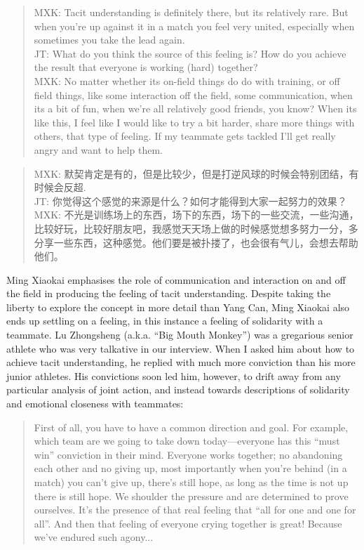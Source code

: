 \begin{CJK}{UTF8}{gbsn}
    \begin{quotation}
        MXK: Tacit understanding is definitely there, but its relatively rare. But when you’re up against it in a match you feel very united, especially when sometimes you take the lead again. \\
        JT: What do you think the source of this feeling is?  How do you achieve the result that everyone is working (hard) together? \\
        MXK: No matter whether its on-field things do do with training, or off field things, like some interaction off the field, some communication, when its a bit of fun, when we're all relatively good friends, you know?  When its like this, I feel like I would like to try a bit harder, share more things with others, that type of feeling.  If my teammate gets tackled I'll get really angry and want to help them.
    \end{quotation}

    \begin{quotation}
        MXK: 默契肯定是有的，但是比较少，但是打逆风球的时候会特别团结，有时候会反超. \\
        JT: 你觉得这个感觉的来源是什么？如何才能得到大家一起努力的效果？ \\
        MXK: 不光是训练场上的东西，场下的东西，场下的一些交流，一些沟通，比较好玩，比较好朋友吧，我感觉天天场上做的时候感觉想多努力一分，多分享一些东西，这种感觉。他们要是被扑搂了，也会很有气儿，会想去帮助他们。 
    \end{quotation}

Ming Xiaokai emphasises the role of communication and interaction on and off the field in producing the feeling of tacit understanding.  Despite taking the liberty to explore the concept in more detail than Yang Can, Ming Xiaokai also ends up settling on a feeling, in this instance a feeling of solidarity with a teammate.  Lu Zhongsheng (a.k.a. ``Big Mouth Monkey'') was a gregarious senior athlete who was very talkative in our interview.  When I asked him about how to achieve tacit understanding, he replied with much more conviction than his more junior athletes.  His convictions soon led him, however, to drift away from any particular analysis of joint action, and instead towards descriptions of solidarity and emotional closeness with teammates:

    \begin{quotation}
      First of all, you have to have a common direction and goal.  For example, which team are we going to take down today---everyone has this ``must win'' conviction in their mind.  Everyone works together; no abandoning each other and no giving up, most importantly when you’re behind (in a match) you can’t give up, there’s still hope, as long as the time is not up there is still hope.  We shoulder the pressure and are determined to prove ourselves.  It's the presence of that real feeling that ``all for one and one for all''.  And then that feeling of everyone crying together is great! Because we've endured such agony...
    \end{quotation}


\end{CJK}
